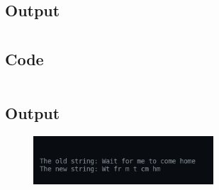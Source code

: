\documentclass[12pt]{article}
\begin{document}
\subsection{Output}
\begin{figure}[h]
    \centering
\end{figure}
\newpage
\section{}
\subsection{Code}
\inputminted{c}{q20.c}
\subsection{Output}
\begin{figure}[h]
    \centering
    \includegraphics[width=0.6\textwidth]{20.png}
\end{figure}
\end{document}
